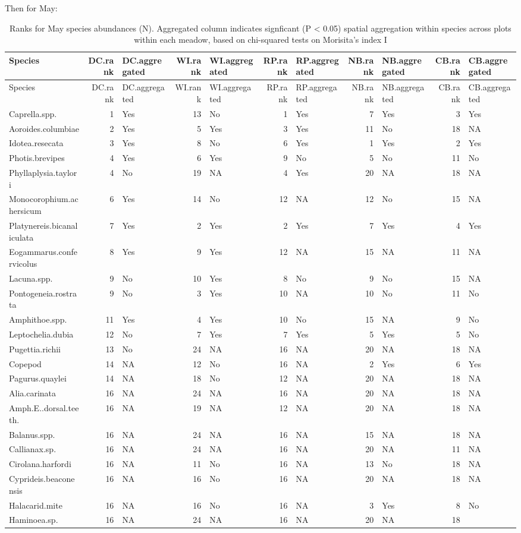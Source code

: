 \documentclass[]{article}
\begin{document}
Then for May:

\begin{longtable}[]{@{}lrlrlrlrlrl@{}}
\caption{Ranks for May species abundances (N). Aggregated column
indicates signficant (P \textless{} 0.05) spatial aggregation within
species across plots within each meadow, based on chi-squared tests on
Morisita's index I}\tabularnewline
\toprule
Species & DC.rank & DC.aggregated & WI.rank & WI.aggregated & RP.rank &
RP.aggregated & NB.rank & NB.aggregated & CB.rank &
CB.aggregated\tabularnewline
\midrule
\endfirsthead
\toprule
Species & DC.rank & DC.aggregated & WI.rank & WI.aggregated & RP.rank &
RP.aggregated & NB.rank & NB.aggregated & CB.rank &
CB.aggregated\tabularnewline
\midrule
\endhead
Caprella.spp. & 1 & Yes & 13 & No & 1 & Yes & 7 & Yes & 3 &
Yes\tabularnewline
Aoroides.columbiae & 2 & Yes & 5 & Yes & 3 & Yes & 11 & No & 18 &
NA\tabularnewline
Idotea.resecata & 3 & Yes & 8 & No & 6 & Yes & 1 & Yes & 2 &
Yes\tabularnewline
Photis.brevipes & 4 & Yes & 6 & Yes & 9 & No & 5 & No & 11 &
No\tabularnewline
Phyllaplysia.taylori & 4 & No & 19 & NA & 4 & Yes & 20 & NA & 18 &
NA\tabularnewline
Monocorophium.achersicum & 6 & Yes & 14 & No & 12 & NA & 12 & No & 15 &
NA\tabularnewline
Platynereis.bicanaliculata & 7 & Yes & 2 & Yes & 2 & Yes & 7 & Yes & 4 &
Yes\tabularnewline
Eogammarus.confervicolus & 8 & Yes & 9 & Yes & 12 & NA & 15 & NA & 11 &
NA\tabularnewline
Lacuna.spp. & 9 & No & 10 & Yes & 8 & No & 9 & No & 15 &
NA\tabularnewline
Pontogeneia.rostrata & 9 & No & 3 & Yes & 10 & NA & 10 & No & 11 &
No\tabularnewline
Amphithoe.spp. & 11 & Yes & 4 & Yes & 10 & No & 15 & NA & 9 &
No\tabularnewline
Leptochelia.dubia & 12 & No & 7 & Yes & 7 & Yes & 5 & Yes & 5 &
No\tabularnewline
Pugettia.richii & 13 & No & 24 & NA & 16 & NA & 20 & NA & 18 &
NA\tabularnewline
Copepod & 14 & NA & 12 & No & 16 & NA & 2 & Yes & 6 & Yes\tabularnewline
Pagurus.quaylei & 14 & NA & 18 & No & 12 & NA & 20 & NA & 18 &
NA\tabularnewline
Alia.carinata & 16 & NA & 24 & NA & 16 & NA & 20 & NA & 18 &
NA\tabularnewline
Amph.E..dorsal.teeth. & 16 & NA & 19 & NA & 12 & NA & 20 & NA & 18 &
NA\tabularnewline
Balanus.spp. & 16 & NA & 24 & NA & 16 & NA & 15 & NA & 18 &
NA\tabularnewline
Callianax.sp. & 16 & NA & 24 & NA & 16 & NA & 20 & NA & 11 &
NA\tabularnewline
Cirolana.harfordi & 16 & NA & 11 & No & 16 & NA & 13 & No & 18 &
NA\tabularnewline
Cyprideis.beaconensis & 16 & NA & 16 & No & 16 & NA & 20 & NA & 18 &
NA\tabularnewline
Halacarid.mite & 16 & NA & 16 & No & 16 & NA & 3 & Yes & 8 &
No\tabularnewline
Haminoea.sp. & 16 & NA & 24 & NA & 16 & NA & 20 & NA & 18 &

\end{longtable}
\end{document}
